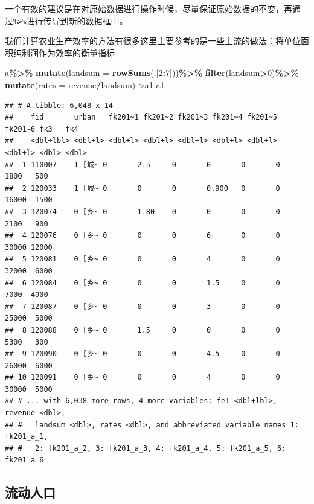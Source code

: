 \documentclass[
]{book}
\newenvironment{Shaded}{\begin{snugshade}}{\end{snugshade}}
\newcommand{\AttributeTok}[1]{\textcolor[rgb]{0.13,0.29,0.53}{#1}}
\newcommand{\DecValTok}[1]{\textcolor[rgb]{0.00,0.00,0.81}{#1}}
\newcommand{\FunctionTok}[1]{\textcolor[rgb]{0.13,0.29,0.53}{\textbf{#1}}}
\newcommand{\NormalTok}[1]{#1}
\newcommand{\OtherTok}[1]{\textcolor[rgb]{0.56,0.35,0.01}{#1}}
\newcommand{\SpecialCharTok}[1]{\textcolor[rgb]{0.81,0.36,0.00}{\textbf{#1}}}
\begin{document}
一个有效的建议是在对原始数据进行操作时候，尽量保证原始数据的不变，再通过\texttt{\%\textgreater{}\%}进行传导到新的数据框中。

我们计算农业生产效率的方法有很多这里主要参考的是一些主流的做法：将单位面积纯利润作为效率的衡量指标

\begin{Shaded}
\begin{Highlighting}[]
\NormalTok{a}\SpecialCharTok{\%\textgreater{}\%}
  \FunctionTok{mutate}\NormalTok{(}\AttributeTok{landsum =} \FunctionTok{rowSums}\NormalTok{(.[}\DecValTok{2}\SpecialCharTok{:}\DecValTok{7}\NormalTok{]))}\SpecialCharTok{\%\textgreater{}\%}
  \FunctionTok{filter}\NormalTok{(landsum}\SpecialCharTok{\textgreater{}}\DecValTok{0}\NormalTok{)}\SpecialCharTok{\%\textgreater{}\%}
  \FunctionTok{mutate}\NormalTok{(}\AttributeTok{rates =}\NormalTok{ revenue}\SpecialCharTok{/}\NormalTok{landsum)}\OtherTok{{-}\textgreater{}}\NormalTok{a1}
\NormalTok{a1}
\end{Highlighting}
\end{Shaded}

\begin{verbatim}
## # A tibble: 6,048 x 14
##    fid       urban   fk201~1 fk201~2 fk201~3 fk201~4 fk201~5 fk201~6 fk3   fk4  
##    <dbl+lbl> <dbl+l> <dbl+l> <dbl+l> <dbl+l> <dbl+l> <dbl+l> <dbl+l> <dbl> <dbl>
##  1 110007    1 [城~ 0       2.5     0       0       0       0        1800   500
##  2 120033    1 [城~ 0       0       0       0.900   0       0       16000  1500
##  3 120074    0 [乡~ 0       1.80    0       0       0       0        2100   900
##  4 120076    0 [乡~ 0       0       0       6       0       0       30000 12000
##  5 120081    0 [乡~ 0       0       0       4       0       0       32000  6000
##  6 120084    0 [乡~ 0       0       0       1.5     0       0        7000  4000
##  7 120087    0 [乡~ 0       0       0       3       0       0       25000  5000
##  8 120088    0 [乡~ 0       1.5     0       0       0       0        5300   300
##  9 120090    0 [乡~ 0       0       0       4.5     0       0       26000  6000
## 10 120091    0 [乡~ 0       0       0       4       0       0       30000  5000
## # ... with 6,038 more rows, 4 more variables: fe1 <dbl+lbl>, revenue <dbl>,
## #   landsum <dbl>, rates <dbl>, and abbreviated variable names 1: fk201_a_1,
## #   2: fk201_a_2, 3: fk201_a_3, 4: fk201_a_4, 5: fk201_a_5, 6: fk201_a_6
\end{verbatim}

\hypertarget{ux6d41ux52a8ux4ebaux53e3}{%
\subsection{流动人口}\label{ux6d41ux52a8ux4ebaux53e3}}
\end{document}
